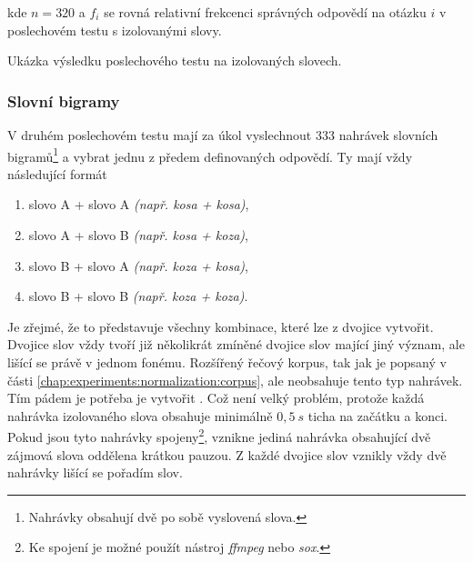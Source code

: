 \noindent kde $n=320$ a $f_i$ se rovná relativní frekcenci správných odpovědí na otázku $i$ v poslechovém testu s izolovanými slovy.

\begin{table}[htpb]
  \centering
  \def\arraystretch{1.5}
  \caption{Ukázka výsledku poslechového testu na izolovaných slovech.}
  \label{tab:experiments:normalization:isolated}
\end{table}

\subsubsection{Slovní bigramy}

V druhém poslechovém testu mají za úkol vyslechnout $333$ nahrávek slovních bigramů\footnote{Nahrávky obsahují dvě po sobě vyslovená slova.} a vybrat jednu z předem definovaných odpovědí. Ty mají vždy následující formát

\begin{enumerate}[label=\alph*)]
  \item slovo A + slovo A \textit{(např. kosa + kosa)},
  \item slovo A + slovo B \textit{(např. kosa + koza)},
  \item slovo B + slovo A \textit{(např. koza + kosa)},
  \item slovo B + slovo B \textit{(např. koza + koza)}.
\end{enumerate}

\noindent Je zřejmé, že to představuje všechny kombinace, které lze z dvojice vytvořit. Dvojice slov vždy tvoří již několikrát zmíněné dvojice slov mající jiný význam, ale lišící se právě v jednom fonému. Rozšířený řečový korpus, tak jak je popsaný v části \ref{chap:experiments:normalization:corpus}, ale neobsahuje tento typ nahrávek. Tím pádem je potřeba je vytvořit . Což není velký problém, protože každá nahrávka izolovaného slova obsahuje minimálně $0,5\ s$ ticha na začátku a konci. Pokud jsou tyto nahrávky spojeny\footnote{Ke spojení je možné použít nástroj \textit{ffmpeg} nebo \textit{sox}.}, vznikne jediná nahrávka obsahující dvě zájmová slova oddělena krátkou pauzou. Z každé dvojice slov vznikly vždy dvě nahrávky lišící se pořadím slov.

